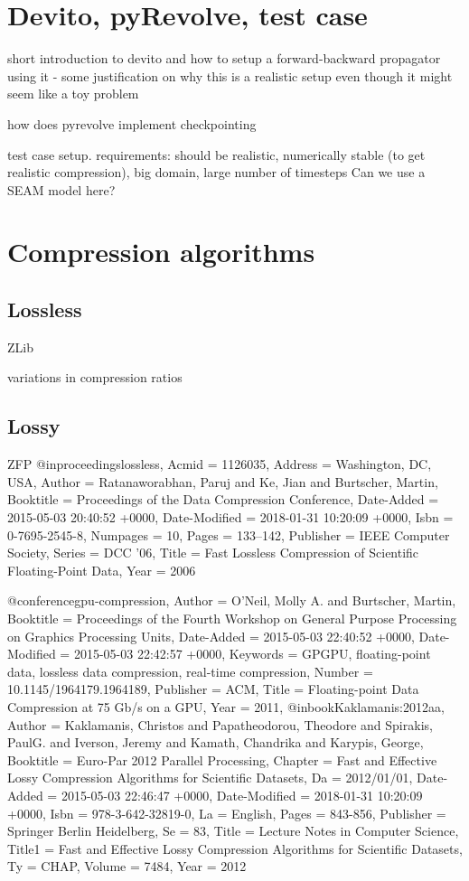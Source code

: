 \documentclass[conference]{IEEEtran}
\begin{document}
\section{Devito, pyRevolve, test case}
short introduction to devito and how to setup a forward-backward
propagator using it - some justification on why this is a realistic
setup even though it might seem like a toy problem

how does pyrevolve implement checkpointing

test case setup.
requirements: should be realistic, numerically stable (to get
realistic compression), big domain,
large number of timesteps
Can we use a SEAM model here?

\section{Compression algorithms}
\subsection{Lossless}
ZLib

variations in compression ratios
\subsection{Lossy}
ZFP
@inproceedings{lossless,
    Acmid = {1126035},
    Address = {Washington, DC, USA},
    Author = {Ratanaworabhan, Paruj and Ke, Jian and Burtscher, Martin},
    Booktitle = {Proceedings of the Data Compression Conference},
    Date-Added = {2015-05-03 20:40:52 +0000},
    Date-Modified = {2018-01-31 10:20:09 +0000},
    Isbn = {0-7695-2545-8},
    Numpages = {10},
    Pages = {133--142},
    Publisher = {IEEE Computer Society},
    Series = {DCC '06},
    Title = {Fast Lossless Compression of Scientific Floating-Point Data},
    Year = {2006}}

@conference{gpu-compression,
    Author = {O'Neil, Molly A. and Burtscher, Martin},
    Booktitle = {Proceedings of the Fourth Workshop on General Purpose Processing on Graphics Processing Units},
    Date-Added = {2015-05-03 22:40:52 +0000},
    Date-Modified = {2015-05-03 22:42:57 +0000},
    Keywords = {GPGPU, floating-point data, lossless data compression, real-time compression},
    Number = {10.1145/1964179.1964189},
    Publisher = {ACM},
    Title = {Floating-point Data Compression at 75 Gb/s on a {GPU}},
    Year = {2011},
}
@inbook{Kaklamanis:2012aa,
    Author = {Kaklamanis, Christos and Papatheodorou, Theodore and Spirakis, PaulG. and Iverson, Jeremy and Kamath, Chandrika and Karypis, George},
    Booktitle = {Euro-Par 2012 Parallel Processing},
    Chapter = {Fast and Effective Lossy Compression Algorithms for Scientific Datasets},
    Da = {2012/01/01},
    Date-Added = {2015-05-03 22:46:47 +0000},
    Date-Modified = {2018-01-31 10:20:09 +0000},
    Isbn = {978-3-642-32819-0},
    La = {English},
    Pages = {843-856},
    Publisher = {Springer Berlin Heidelberg},
    Se = {83},
    Title = {Lecture Notes in Computer Science},
    Title1 = {Fast and Effective Lossy Compression Algorithms for Scientific Datasets},
    Ty = {CHAP},
    Volume = {7484},
    Year = {2012}}
\end{document}

